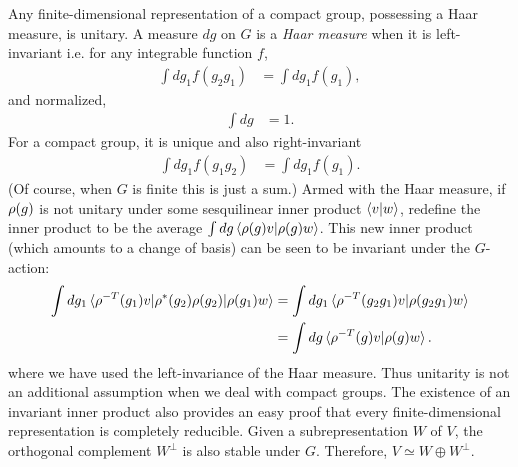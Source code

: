 
Any finite-dimensional representation of a compact group, possessing a Haar measure, is unitary. A measure $dg$ on $G$ is a \emph{Haar measure} when it is left-invariant i.e. for any integrable function $f$,
\begin{align}
\int dg_1 f(g_2 g_1) &= \int dg_1 f(g_1),
\end{align}
and normalized,
\begin{align}
\int dg &= 1.
\end{align}
For a compact group, it is unique and also right-invariant
\begin{align}
\int dg_1 f(g_1 g_2) &= \int dg_1 f(g_1).
\end{align}
(Of course, when $G$ is finite this is just a sum.) Armed with the Haar measure, if $\rho(g)$ is not unitary under some sesquilinear inner product $\braket{v|w}$, redefine the inner product to be the average $\int dg \braket{\rho(g)v|\rho(g)w}$. This new inner product (which amounts to a change of basis) can be seen to be invariant under the $G$-action:
\begin{align*}
\int dg_1 \braket{\rho^{-T}(g_1)v|\rho^*(g_2) \rho(g_2)|\rho(g_1)w}
&= \int dg_1 \braket{\rho^{-T}(g_2 g_1)v|\rho(g_2 g_1)w} \\
&= \int dg \braket{\rho^{-T}(g)v|\rho(g)w}.
\end{align*}
where we have used the left-invariance of the Haar measure. Thus unitarity is not an additional assumption when we deal with compact groups. The existence of an invariant inner product also provides an easy proof that every finite-dimensional representation is completely reducible. Given a subrepresentation $W$ of $V$, the orthogonal complement $W^{\perp}$ is also stable under $G$. Therefore, $V \simeq W \oplus W^{\perp}$.


